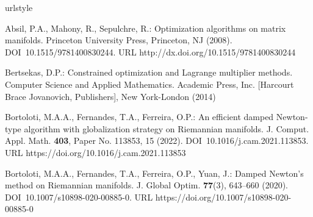 %
%



\begin{thebibliography}{}

%
\providecommand{\url}[1]{{#1}}
\providecommand{\urlprefix}{URL }
\expandafter\ifx\csname urlstyle\endcsname\relax
  \providecommand{\doi}[1]{DOI~\discretionary{}{}{}#1}\else
  \providecommand{\doi}{DOI~\discretionary{}{}{}\begingroup
  \urlstyle{rm}\Url}\fi

Absil, P.A., Mahony, R., Sepulchre, R.: Optimization algorithms on matrix
  manifolds.
\newblock Princeton University Press, Princeton, NJ (2008).
\newblock \doi{10.1515/9781400830244}.
\newblock \urlprefix\url{http://dx.doi.org/10.1515/9781400830244}

Bertsekas, D.P.: Constrained optimization and {L}agrange multiplier methods.
\newblock Computer Science and Applied Mathematics. Academic Press, Inc.
  [Harcourt Brace Jovanovich, Publishers], New York-London (2014)

Bortoloti, M.A.A., Fernandes, T.A., Ferreira, O.P.: An efficient damped
  {N}ewton-type algorithm with globalization strategy on {R}iemannian
  manifolds.
\newblock J. Comput. Appl. Math. \textbf{403}, Paper No. 113853, 15 (2022).
\newblock \doi{10.1016/j.cam.2021.113853}.
\newblock \urlprefix\url{https://doi.org/10.1016/j.cam.2021.113853}

Bortoloti, M.A.A., Fernandes, T.A., Ferreira, O.P., Yuan, J.: Damped {N}ewton's
  method on {R}iemannian manifolds.
\newblock J. Global Optim. \textbf{77}(3), 643--660 (2020).
\newblock \doi{10.1007/s10898-020-00885-0}.
\newblock \urlprefix\url{https://doi.org/10.1007/s10898-020-00885-0}


\end{thebibliography}
